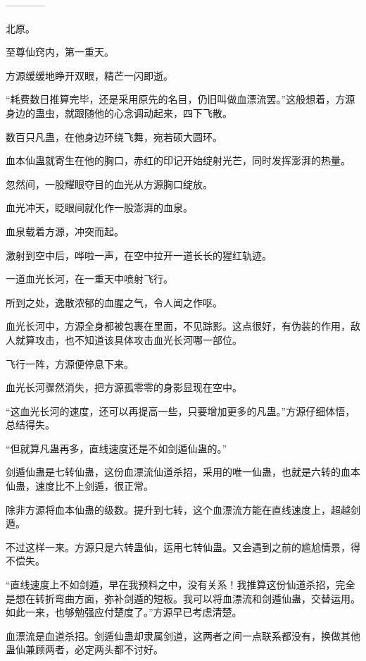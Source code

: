 
\begin{this_body}

------------

北原。

至尊仙窍内，第一重天。

方源缓缓地睁开双眼，精芒一闪即逝。

“耗费数日推算完毕，还是采用原先的名目，仍旧叫做血漂流罢。”这般想着，方源身边的蛊虫，就跟随他的心念调动起来，四下飞散。

数百只凡蛊，在他身边环绕飞舞，宛若硕大圆环。

血本仙蛊就寄生在他的胸口，赤红的印记开始绽射光芒，同时发挥澎湃的热量。

忽然间，一股耀眼夺目的血光从方源胸口绽放。

血光冲天，眨眼间就化作一股澎湃的血泉。

血泉载着方源，冲突而起。

激射到空中后，哗啦一声，在空中拉开一道长长的猩红轨迹。

一道血光长河，在一重天中喷射飞行。

所到之处，逸散浓郁的血腥之气，令人闻之作呕。

血光长河中，方源全身都被包裹在里面，不见踪影。这点很好，有伪装的作用，敌人就算攻击，也不知道该具体攻击血光长河哪一部位。

飞行一阵，方源便停息下来。

血光长河骤然消失，把方源孤零零的身影显现在空中。

“这血光长河的速度，还可以再提高一些，只要增加更多的凡蛊。”方源仔细体悟，总结得失。

“但就算凡蛊再多，直线速度还是不如剑遁仙蛊的。”

剑遁仙蛊是七转仙蛊，这份血漂流仙道杀招，采用的唯一仙蛊，也就是六转的血本仙蛊，速度比不上剑遁，很正常。

除非方源将血本仙蛊的级数。提升到七转，这个血漂流方能在直线速度上，超越剑遁。

不过这样一来。方源只是六转蛊仙，运用七转仙蛊。又会遇到之前的尴尬情景，得不偿失。

“直线速度上不如剑遁，早在我预料之中，没有关系！我推算这份仙道杀招，完全是想在转折弯曲方面，弥补剑遁的短板。我可以将血漂流和剑遁仙蛊，交替运用。如此一来，也够勉强应付楚度了。”方源早已考虑清楚。

血漂流是血道杀招。剑遁仙蛊却隶属剑道，这两者之间一点联系都没有，换做其他蛊仙兼顾两者，必定两头都不讨好。


\end{this_body}

